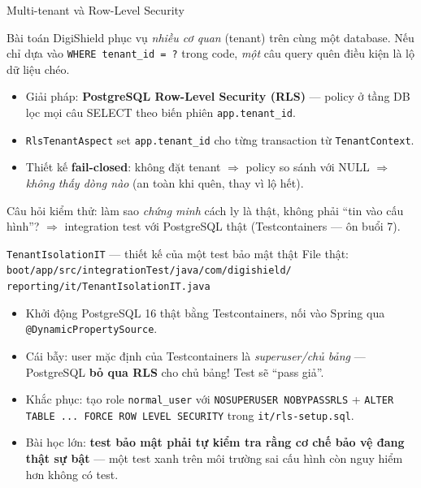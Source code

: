 \documentclass[aspectratio=169,12pt]{beamer}
\begin{document}
\begin{frame}{Multi-tenant và Row-Level Security}
  \begin{block}{Bài toán}
    DigiShield phục vụ \emph{nhiều cơ quan} (tenant) trên cùng một database. Nếu chỉ dựa vào \texttt{WHERE tenant\_id = ?} trong code, \emph{một} câu query quên điều kiện là lộ dữ liệu chéo.
  \end{block}
  \begin{itemize}
    \item Giải pháp: \textbf{PostgreSQL Row-Level Security (RLS)} --- policy ở tầng DB lọc mọi câu SELECT theo biến phiên \texttt{app.tenant\_id}.
    \item \texttt{RlsTenantAspect} set \texttt{app.tenant\_id} cho từng transaction từ \texttt{TenantContext}.
    \item Thiết kế \textbf{fail-closed}: không đặt tenant $\Rightarrow$ policy so sánh với NULL $\Rightarrow$ \emph{không thấy dòng nào} (an toàn khi quên, thay vì lộ hết).
  \end{itemize}
  \small Câu hỏi kiểm thử: làm sao \emph{chứng minh} cách ly là thật, không phải ``tin vào cấu hình''? $\Rightarrow$ integration test với PostgreSQL thật (Testcontainers --- ôn buổi 7).
\end{frame}

\begin{frame}{\texttt{TenantIsolationIT} --- thiết kế của một test bảo mật thật}
  File thật: \texttt{boot/app/src/integrationTest/java/com/digishield/}\\
  \texttt{reporting/it/TenantIsolationIT.java}
  \begin{itemize}
    \item Khởi động PostgreSQL 16 thật bằng Testcontainers, nối vào Spring qua \texttt{@DynamicPropertySource}.
    \item \alert{Cái bẫy}: user mặc định của Testcontainers là \emph{superuser/chủ bảng} --- PostgreSQL \textbf{bỏ qua RLS} cho chủ bảng! Test sẽ ``pass giả''.
    \item Khắc phục: tạo role \texttt{normal\_user} với \texttt{NOSUPERUSER NOBYPASSRLS} + \texttt{ALTER TABLE ... FORCE ROW LEVEL SECURITY} trong \texttt{it/rls-setup.sql}.
    \item Bài học lớn: \textbf{test bảo mật phải tự kiểm tra rằng cơ chế bảo vệ đang thật sự bật} --- một test xanh trên môi trường sai cấu hình còn nguy hiểm hơn không có test.
  \end{itemize}
\end{frame}
\end{document}
